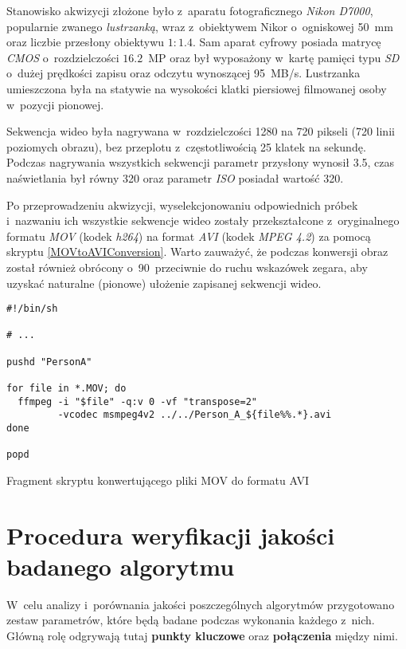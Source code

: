    Stanowisko akwizycji złożone było z~aparatu fotograficznego \textit{Nikon D7000}, popularnie zwanego \textit{lustrzanką}, wraz z~obiektywem Nikor o~ogniskowej 50~mm oraz liczbie przesłony obiektywu $1:1.4$. Sam aparat cyfrowy posiada matrycę \textit{CMOS} o~rozdzielczości $16.2$~MP oraz był wyposażony w~kartę pamięci typu \textit{SD} o~dużej prędkości zapisu oraz odczytu wynoszącej 95~MB/s. Lustrzanka umieszczona była na statywie na wysokości klatki piersiowej filmowanej osoby w~pozycji pionowej.

    Sekwencja wideo była nagrywana w~rozdzielczości 1280 na 720 pikseli (720 linii poziomych obrazu), bez przeplotu z~częstotliwością 25 klatek na sekundę. Podczas nagrywania wszystkich sekwencji parametr przysłony wynosił 3.5, czas naświetlania był równy 320 oraz parametr \textit{ISO} posiadał wartość 320.

    Po przeprowadzeniu akwizycji, wyselekcjonowaniu odpowiednich próbek i~nazwaniu ich wszystkie sekwencje wideo zostały przekształcone z~oryginalnego formatu \textit{MOV} (kodek \textit{h264}) na format \textit{AVI} (kodek \textit{MPEG 4.2}) za pomocą skryptu \ref{MOVtoAVIConversion}. Warto zauważyć, że podczas konwersji obraz został również obrócony o~90\degree~przeciwnie do ruchu wskazówek zegara, aby uzyskać naturalne (pionowe) ułożenie zapisanej sekwencji wideo.

      \begin{sample}[ht]
        \begin{verbatim}
#!/bin/sh

# ...

pushd "PersonA"

for file in *.MOV; do
  ffmpeg -i "$file" -q:v 0 -vf "transpose=2"
         -vcodec msmpeg4v2 ../../Person_A_${file%%.*}.avi
done

popd
        \end{verbatim}
        \caption{Fragment skryptu konwertującego pliki MOV do formatu AVI}
        \label{MOVtoAVIConversion}
      \end{sample}

  \section{Procedura weryfikacji jakości badanego algorytmu}\label{Section_Jakosc}

    W~celu analizy i~porównania jakości poszczególnych algorytmów przygotowano zestaw parametrów, które będą badane podczas wykonania każdego z~nich. Główną rolę odgrywają tutaj \textbf{punkty kluczowe} oraz \textbf{połączenia} między nimi.

